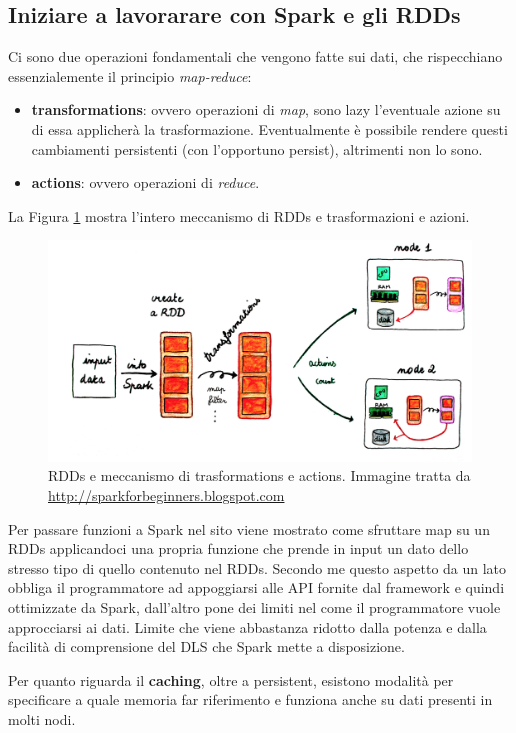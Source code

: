 \documentclass[12pt,italian]{article}
\begin{document}
\subsection{Iniziare a lavorarare con Spark e gli RDDs}
Ci sono due operazioni fondamentali che vengono fatte sui dati, che rispecchiano essenzialemente il principio \textit{map-reduce}:
\begin{itemize}
	\item \textbf{transformations}: ovvero operazioni di \textit{map}, sono lazy l'eventuale azione su di essa applicherà la trasformazione. Eventualmente è possibile rendere questi cambiamenti persistenti (con l'opportuno persist), altrimenti non lo sono.
	\item \textbf{actions}\label{sec:actions}: ovvero operazioni di \textit{reduce}.
\end{itemize}
La Figura \ref{fig:RDDs} mostra l'intero meccanismo di RDDs e trasformazioni e azioni.
\begin{figure}
	\centering 
	\includegraphics[width=1\linewidth]{img/rdds.png}
	\caption{RDDs e meccanismo di trasformations e actions. Immagine tratta da \url{http://sparkforbeginners.blogspot.com}}
	\label{fig:RDDs}
\end{figure}
\par Per passare funzioni a Spark nel sito viene mostrato come sfruttare map su un RDDs applicandoci una propria funzione che prende in input un dato dello stresso tipo di quello contenuto nel RDDs. Secondo me questo aspetto da un lato obbliga il programmatore ad appoggiarsi alle API fornite dal framework e quindi ottimizzate da Spark, dall'altro pone dei limiti nel come il programmatore vuole approcciarsi ai dati. Limite che viene abbastanza ridotto dalla potenza e dalla facilità di comprensione del DLS che Spark mette a disposizione.
\par Per quanto riguarda il \textbf{caching}, oltre a persistent, esistono modalità per specificare a quale memoria far riferimento e funziona anche su dati presenti in molti nodi.
\end{document}
